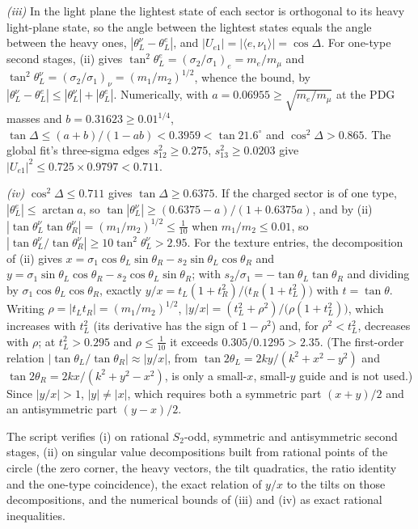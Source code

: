 \emph{(iii)} In the light plane the lightest state of each sector is orthogonal to its heavy light-plane state, so the angle between the lightest states equals the angle between the heavy ones, $|\theta_{L}^{\nu} - \theta_{L}^{e}|$, and $|U_{e1}| = |\langle e, \nu_{1}\rangle| = \cos\Delta$. For one-type second stages, (ii) gives $\tan^{2}\theta_{L}^{e} = (\sigma_{2}/\sigma_{1})_{e} = m_{e}/m_{\mu}$ and $\tan^{2}\theta_{L}^{\nu} = (\sigma_{2}/\sigma_{1})_{\nu} = (m_{1}/m_{2})^{1/2}$, whence the bound, by $|\theta_{L}^{\nu} - \theta_{L}^{e}| \le |\theta_{L}^{\nu}| + |\theta_{L}^{e}|$. Numerically, with $a = 0.06955 \ge \sqrt{m_{e}/m_{\mu}}$ at the PDG masses and $b = 0.31623 \ge 0.01^{1/4}$, $\tan\Delta \le (a + b)/(1 - ab) < 0.3959 < \tan 21.6^{\circ}$ and $\cos^{2}\Delta > 0.865$. The global fit's three-sigma edges $s_{12}^{2} \ge 0.275$, $s_{13}^{2} \ge 0.0203$ give $|U_{e1}|^{2} \le 0.725 \times 0.9797 < 0.711$.

\emph{(iv)} $\cos^{2}\Delta \le 0.711$ gives $\tan\Delta \ge 0.6375$. If the charged sector is of one type, $|\theta_{L}^{e}| \le \arctan a$, so $\tan|\theta_{L}^{\nu}| \ge (0.6375 - a)/(1 + 0.6375a)$, and by (ii) $|\tan\theta_{L}^{\nu}\tan\theta_{R}^{\nu}| = (m_{1}/m_{2})^{1/2} \le \tfrac{1}{10}$ when $m_{1}/m_{2} \le 0.01$, so $|\tan\theta_{L}^{\nu}/\tan\theta_{R}^{\nu}| \ge 10\tan^{2}\theta_{L}^{\nu} > 2.95$. For the texture entries, the decomposition of (ii) gives $x = \sigma_{1}\cos\theta_{L}\sin\theta_{R} - s_{2}\sin\theta_{L}\cos\theta_{R}$ and $y = \sigma_{1}\sin\theta_{L}\cos\theta_{R} - s_{2}\cos\theta_{L}\sin\theta_{R}$; with $s_{2}/\sigma_{1} = -\tan\theta_{L}\tan\theta_{R}$ and dividing by $\sigma_{1}\cos\theta_{L}\cos\theta_{R}$, exactly $y/x = t_{L}(1 + t_{R}^{2})/\bigl(t_{R}(1 + t_{L}^{2})\bigr)$ with $t = \tan\theta$. Writing $\rho = |t_{L}t_{R}| = (m_{1}/m_{2})^{1/2}$, $|y/x| = (t_{L}^{2} + \rho^{2})/\bigl(\rho(1 + t_{L}^{2})\bigr)$, which increases with $t_{L}^{2}$ (its derivative has the sign of $1 - \rho^{2}$) and, for $\rho^{2} < t_{L}^{2}$, decreases with $\rho$; at $t_{L}^{2} > 0.295$ and $\rho \le \tfrac{1}{10}$ it exceeds $0.305/0.1295 > 2.35$. (The first-order relation $|\tan\theta_{L}/\tan\theta_{R}| \approx |y/x|$, from $\tan 2\theta_{L} = 2ky/(k^{2} + x^{2} - y^{2})$ and $\tan 2\theta_{R} = 2kx/(k^{2} + y^{2} - x^{2})$, is only a small-$x$, small-$y$ guide and is not used.) Since $|y/x| > 1$, $|y| \ne |x|$, which requires both a symmetric part $(x + y)/2$ and an antisymmetric part $(y - x)/2$.

The script verifies (i) on rational $S_{2}$-odd, symmetric and antisymmetric second stages, (ii) on singular value decompositions built from rational points of the circle (the zero corner, the heavy vectors, the tilt quadratics, the ratio identity and the one-type coincidence), the exact relation of $y/x$ to the tilts on those decompositions, and the numerical bounds of (iii) and (iv) as exact rational inequalities.
